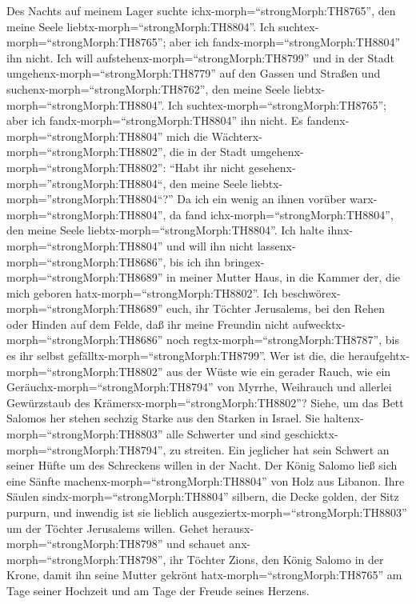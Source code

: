  Des Nachts auf meinem Lager suchte
ichx-morph=``strongMorph:TH8765'', den meine Seele
liebtx-morph=``strongMorph:TH8804''. Ich
suchtex-morph=``strongMorph:TH8765''; aber ich
fandx-morph=``strongMorph:TH8804'' ihn nicht.  Ich will
aufstehenx-morph=``strongMorph:TH8799'' und in der Stadt
umgehenx-morph=``strongMorph:TH8779'' auf den Gassen und Straßen und
suchenx-morph=``strongMorph:TH8762'', den meine Seele
liebtx-morph=``strongMorph:TH8804''. Ich
suchtex-morph=``strongMorph:TH8765''; aber ich
fandx-morph=``strongMorph:TH8804'' ihn nicht.  Es
fandenx-morph=``strongMorph:TH8804'' mich die
Wächterx-morph=``strongMorph:TH8802'', die in der Stadt
umgehenx-morph=``strongMorph:TH8802'': ``Habt ihr nicht
gesehenx-morph=''strongMorph:TH8804``, den meine Seele
liebtx-morph=''strongMorph:TH8804``?''  Da ich ein wenig an
ihnen vorüber warx-morph=``strongMorph:TH8804'', da fand
ichx-morph=``strongMorph:TH8804'', den meine Seele
liebtx-morph=``strongMorph:TH8804''. Ich halte
ihnx-morph=``strongMorph:TH8804'' und will ihn nicht
lassenx-morph=``strongMorph:TH8686'', bis ich ihn
bringex-morph=``strongMorph:TH8689'' in meiner Mutter Haus, in die
Kammer der, die mich geboren hatx-morph=``strongMorph:TH8802''.
 Ich beschwörex-morph=``strongMorph:TH8689'' euch, ihr
Töchter Jerusalems, bei den Rehen oder Hinden auf dem Felde, daß ihr
meine Freundin nicht aufwecktx-morph=``strongMorph:TH8686'' noch
regtx-morph=``strongMorph:TH8787'', bis es ihr selbst
gefälltx-morph=``strongMorph:TH8799''.  Wer ist die, die
heraufgehtx-morph=``strongMorph:TH8802'' aus der Wüste wie ein gerader
Rauch, wie ein Geräuchx-morph=``strongMorph:TH8794'' von Myrrhe,
Weihrauch und allerlei Gewürzstaub des
Krämersx-morph=``strongMorph:TH8802''?  Siehe, um das Bett
Salomos her stehen sechzig Starke aus den Starken in Israel.
 Sie haltenx-morph=``strongMorph:TH8803'' alle Schwerter und
sind geschicktx-morph=``strongMorph:TH8794'', zu streiten. Ein jeglicher
hat sein Schwert an seiner Hüfte um des Schreckens willen in der Nacht.
 Der König Salomo ließ sich eine Sänfte
machenx-morph=``strongMorph:TH8804'' von Holz aus Libanon. 
Ihre Säulen sindx-morph=``strongMorph:TH8804'' silbern, die Decke
golden, der Sitz purpurn, und inwendig ist sie lieblich
ausgeziertx-morph=``strongMorph:TH8803'' um der Töchter Jerusalems
willen.  Gehet herausx-morph=``strongMorph:TH8798'' und
schauet anx-morph=``strongMorph:TH8798'', ihr Töchter Zions, den König
Salomo in der Krone, damit ihn seine Mutter gekrönt
hatx-morph=``strongMorph:TH8765'' am Tage seiner Hochzeit und am Tage
der Freude seines Herzens.

